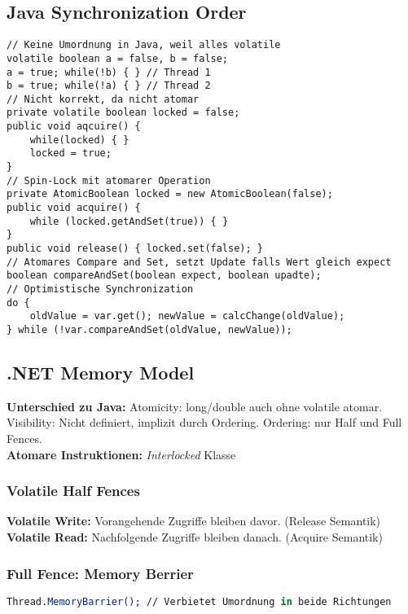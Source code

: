 \subsection{Java Synchronization Order}
\begin{lstlisting}
// Keine Umordnung in Java, weil alles volatile
volatile boolean a = false, b = false;
a = true; while(!b) { } // Thread 1 
b = true; while(!a) { } // Thread 2 
// Nicht korrekt, da nicht atomar 
private volatile boolean locked = false;
public void aqcuire() {
    while(locked) { }
    locked = true;
}
// Spin-Lock mit atomarer Operation
private AtomicBoolean locked = new AtomicBoolean(false);
public void acquire() {
    while (locked.getAndSet(true)) { }
}
public void release() { locked.set(false); }
// Atomares Compare and Set, setzt Update falls Wert gleich expect
boolean compareAndSet(boolean expect, boolean upadte);
// Optimistische Synchronization
do {
    oldValue = var.get(); newValue = calcChange(oldValue);
} while (!var.compareAndSet(oldValue, newValue));
\end{lstlisting}

\subsection{.NET Memory Model}
\textbf{Unterschied zu Java:} Atomicity: long/double auch ohne volatile atomar.
Visibility: Nicht definiert, implizit durch Ordering.
Ordering: nur Half und Full Fences.\\ 
\textbf{Atomare Instruktionen:} \textit{Interlocked} Klasse

\subsubsection{Volatile Half Fences}
\textbf{Volatile Write:} Vorangehende Zugriffe bleiben davor. (Release Semantik)
\textbf{Volatile Read:} Nachfolgende Zugriffe bleiben danach. (Acquire Semantik)

\subsubsection{Full Fence: Memory Berrier}
\begin{lstlisting}[language=csh]
Thread.MemoryBarrier(); // Verbietet Umordnung in beide Richtungen
\end{lstlisting}